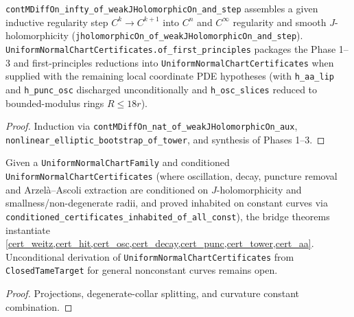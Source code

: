 \begin{theorem}
\label{n3_phase3_tower}
\leanok
{}
\texttt{contMDiffOn\_infty\_of\_weakJHolomorphicOn\_and\_step} assembles a given inductive regularity step
$C^k\to C^{k+1}$ into $C^n$ and $C^\infty$ regularity and smooth $J$-holomorphicity
(\texttt{jholomorphicOn\_of\_weakJHolomorphicOn\_and\_step}).
\texttt{UniformNormalChartCertificates.of\_first\_principles} packages the Phase 1--3 and first-principles
reductions into \texttt{UniformNormalChartCertificates} when supplied with the remaining local coordinate
PDE hypotheses (with \texttt{h\_aa\_lip} and \texttt{h\_punc\_osc} discharged unconditionally and
\texttt{h\_osc\_slices} reduced to bounded-modulus rings $R\le 18r$).
\end{theorem}
\begin{proof}\leanok Induction via \texttt{contMDiffOn\_nat\_of\_weakJHolomorphicOn\_aux},
\texttt{nonlinear\_elliptic\_bootstrap\_of\_tower}, and synthesis of Phases 1--3.\end{proof}

\begin{theorem}
\label{n3_certs}
\leanok
{}
Given a \texttt{UniformNormalChartFamily} and conditioned \texttt{UniformNormalChartCertificates}
(where oscillation, decay, puncture removal and Arzel\`a--Ascoli extraction are conditioned on
$J$-holomorphicity and smallness/non-degenerate radii, and proved inhabited on constant curves via
\texttt{conditioned\_certificates\_inhabited\_of\_all\_const}), the bridge theorems instantiate
\cref{cert_weitz,cert_hit,cert_osc,cert_decay,cert_punc,cert_tower,cert_aa}. Unconditional derivation
of \texttt{UniformNormalChartCertificates} from \texttt{ClosedTameTarget} for general nonconstant
curves remains open.
\end{theorem}
\begin{proof}\leanok Projections, degenerate-collar splitting, and curvature constant combination.\end{proof}
